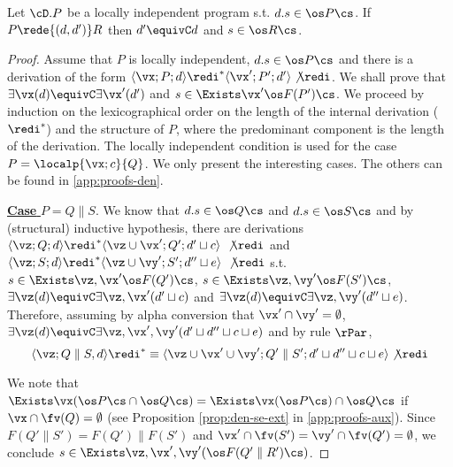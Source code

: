 \documentclass{tlp}
\begin{document}
\begin{lemma}[Completeness]\label{theo:comp}
Let  $\cD.P$ be a locally independent program s.t. $d.s \in \os P \cs$. If $P\rede{(d, d')} R$ then $d' \equivC d$ and 
$s \in \os R \cs$. 
\end{lemma}
\begin{proof} 
Assume that   $P$ is locally independent, $d.s \in \os P \cs$ and there is a derivation of the form  $\langle \vx;P;d\rangle \redi^*\langle \vx';P';d'\rangle \not\redi$. We shall prove that $\exists \vx(d) \equivC \exists \vx'(d')$ and
$s\in \Exists \vx' \os  F(P')\cs$. 
	We proceed by induction on the lexicographical order on the length of the internal derivation  ($\redi^*$)  and the structure of  $P$, where the predominant component is the length of the derivation. 
 The locally independent condition is used for the case $P=\localp{\vx;c}{Q}$. We only present the interesting cases. The others can be found in \ref{app:proofs-den}. 


\noindent \underline{{\bf Case}  $P=Q \parallel S$}. We know that $d.s \in \os Q\cs$ and $d.s \in \os S\cs$ and by (structural) inductive hypothesis,  there are derivations  $\langle \vz; Q;d\rangle \redi^* \langle \vz\cup \vx'; Q';d'\sqcup c\rangle\ \not\redi $ and $\langle \vz ;S;d\rangle \redi^* \langle \vz\cup  \vy'; S';d'' \sqcup e\rangle\ \not\redi $ s.t.  $s \in  \Exists  \vz,\vx' \os F(Q')\cs$,  $ s\in  \Exists \vz,\vy'\os  F(S')\cs$, $  \exists \vz(d) \equivC \exists \vz,\vx'(d' \sqcup c)$ and $  \exists \vz(d) \equivC   \exists \vz,\vy' (d''\sqcup  e)$. Therefore,
assuming by alpha conversion that $\vx' \cap \vy' = \emptyset$, 
 $\exists \vz(d) \equivC \exists \vz,\vx',\vy' (d' \sqcup d'' \sqcup c \sqcup e)$ and by  rule $\rPar$, 
\[
 \langle \vz; Q\parallel S, d \rangle \redi^* \equiv \langle \vz\cup\vx'\cup \vy' ;Q'\parallel S'; d'\sqcup d'' \sqcup c \sqcup e \rangle \not\redi
\]

We note that  $\Exists \vx( \os P \cs \cap \os Q\cs) = \Exists \vx(\os P\cs) \cap \os Q \cs$ if $\vx\cap\fv(Q) = \emptyset$ (see Proposition \ref{prop:den-se-ext} in \ref{app:proofs-aux}). Since $F(Q'\parallel S') = F(Q') \parallel F(S')$
and $\vx' \cap \fv(S') = \vy' \cap \fv(Q')=\emptyset$,  we conclude $s\in \Exists \vz,\vx',\vy' (\os F(Q'\parallel R')\cs)$.







\end{proof}
\end{document}
